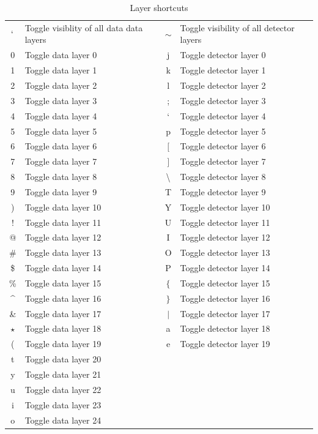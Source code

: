 \documentclass[a4paper,10pt]{article}
\begin{document}
\begin{center}
\begin{table}
\begin{tabular}[ht]{|c|l||c|l|}
$`$ & Toggle visiblity of all data data layers & $\sim$ & Toggle visibility of all detector layers\\
  0 & Toggle data layer 0                  &j   & Toggle detector layer 0\\ 
  1 & Toggle data layer 1                  &k   & Toggle detector layer 1\\ 
  2 & Toggle data layer 2                  &l   & Toggle detector layer 2\\ 
  3 & Toggle data layer 3                  &;   & Toggle detector layer 3\\ 
  4 & Toggle data layer 4                  &`   & Toggle detector layer 4\\ 
  5 & Toggle data layer 5                  &p   & Toggle detector layer 5\\ 
  6 & Toggle data layer 6                  &$[$ & Toggle detector layer 6\\ 
  7 & Toggle data layer 7                  &$]$ & Toggle detector layer 7\\ 
  8 & Toggle data layer 8                  &\textbackslash   & Toggle detector layer 8\\ 
  9 & Toggle data layer 9                  &T   & Toggle detector layer 9\\ 
  ) & Toggle data layer 10                 &Y   & Toggle detector layer 10\\
  ! & Toggle data layer 11                 &U   & Toggle detector layer 11\\
  @ & Toggle data layer 12                 &I   & Toggle detector layer 12\\
  \# & Toggle data layer 13                &O   & Toggle detector layer 13\\
  \$ & Toggle data layer 14                &P   & Toggle detector layer 14\\
  \% & Toggle data layer 15                &$\{$   & Toggle detector layer 15\\
  \textasciicircum  & Toggle data layer 16 &$\}$   & Toggle detector layer 16\\
  \& & Toggle data layer 17                &$|$   & Toggle detector layer 17\\
  $\star$ & Toggle data layer 18           &a   & Toggle detector layer 18\\
  ( & Toggle data layer 19                 &e   & Toggle detector layer 19\\
  t & Toggle data layer 20                 & &\\
  y & Toggle data layer 21                 & &\\
  u & Toggle data layer 22                 & &\\
  i & Toggle data layer 23                 & &\\
  o & Toggle data layer 24                 & &\\
  \hline
\end{tabular}
\caption{Layer shortcuts}
\label{layershortcuts}
\end{table}
\end{center}
\end{document}
